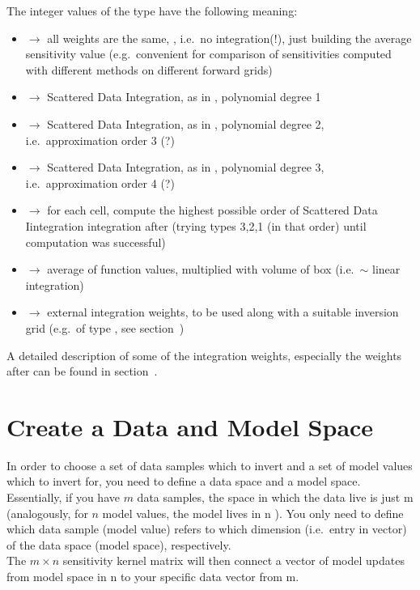 The integer values of the type have the following meaning:
\begin{itemize}
  \item[]  $\rightarrow$ all weights are the same, , 
    i.e.\ no integration(!), just building the average sensitivity value (e.g.\ convenient for comparison of 
    sensitivities computed with different methods on different forward grids)
  \item[]  $\rightarrow$ Scattered Data Integration, as in \cite{Levin99}, polynomial degree 1
  \item[]  $\rightarrow$ Scattered Data Integration, as in \cite{Levin99}, polynomial degree 2, 
    i.e.\ approximation order 3 (?)
  \item[]  $\rightarrow$ Scattered Data Integration, as in \cite{Levin99}, polynomial degree 3, 
    i.e.\ approximation order 4 (?)
  \item[]  $\rightarrow$ for each cell, compute the highest possible order of Scattered Data Iintegration
    integration after \cite{Levin99} (trying types 3,2,1 (in that order) until computation was successful)
  \item[]  $\rightarrow$ average of function values, multiplied with volume of box (i.e.\ $\sim$ linear integration)
  \item[]  $\rightarrow$ external integration weights, to be used along with a suitable inversion grid 
    (e.g.\ of type , see section~)
\end{itemize}

A detailed description of some of the integration weights, especially the weights after \cite{Levin99} can be found in 
section~.
%
\section{Create a Data and Model Space} \label{basic_steps,sec:dmspace}
%
In order to choose a set of data samples which to invert and a set of model values which to invert for, 
you need to define a data space and a model space. Essentially, if you have $m$ data samples, the space in which 
the data live is just \R m (analogously, for $n$ model values, the model lives in \R n ). You only need to define which
data sample (model value) refers to which dimension (i.e.\ entry in vector) of the data space (model space), respectively.\\
The $m\times n$ sensitivity kernel matrix will then connect a vector of model updates from model space in \R n 
to your specific data vector from \R m.

